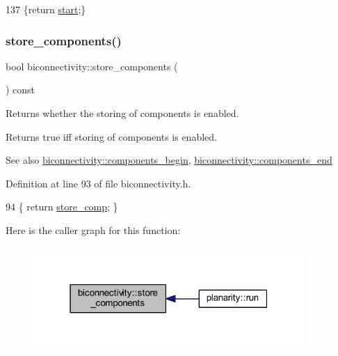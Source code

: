 \begin{DoxyCode}
137 \{\textcolor{keywordflow}{return} \mbox{\hyperlink{classdfs_af677cfc31fe06a18dd3a3aae7f7d112b}{start}};\}
\end{DoxyCode}
\mbox{\label{classbiconnectivity_a1234e7a70f50fd60c855529fe6fa4acb}} 
\subsubsection{\texorpdfstring{store\+\_\+components()}{store\_components()}\hspace{0.1cm}{\footnotesize\ttfamily [1/2]}}
{\footnotesize\ttfamily bool biconnectivity\+::store\+\_\+components (\begin{DoxyParamCaption}{ }\end{DoxyParamCaption}) const\hspace{0.3cm}{\ttfamily [inline]}}



Returns whether the storing of components is enabled. 

\begin{DoxyReturn}{Returns}
true iff storing of components is enabled. 
\end{DoxyReturn}
\begin{DoxySeeAlso}{See also}
\mbox{\hyperlink{classbiconnectivity_ac0b7253533edc3f1412f771cb35bf04a}{biconnectivity\+::components\+\_\+begin}}, \mbox{\hyperlink{classbiconnectivity_a0bd1c70975e664174e591efd64f8dc71}{biconnectivity\+::components\+\_\+end}} 
\end{DoxySeeAlso}


Definition at line 93 of file biconnectivity.\+h.


\begin{DoxyCode}
94     \{ \textcolor{keywordflow}{return} \mbox{\hyperlink{classbiconnectivity_a989307b07f4a976649bd7551173bd564}{store\_comp}}; \}
\end{DoxyCode}
Here is the caller graph for this function\+:\nopagebreak
\begin{figure}[H]
\begin{center}
\leavevmode
\includegraphics[width=292pt]{classbiconnectivity_a1234e7a70f50fd60c855529fe6fa4acb_icgraph}
\end{center}
\end{figure}
\mbox{\label{classbiconnectivity_ab7c9e256a4d7a4ffea33b20f014e1f69}} 
